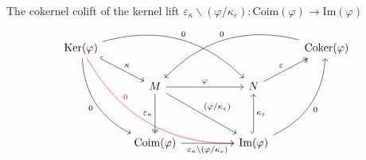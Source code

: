 The cokernel colift of the kernel lift
$\varepsilon_{\kappa}\backslash(\varphi/\kappa_{\varepsilon}) : \mathrm{Coim}(\varphi) \rightarrow \mathrm{Im}(\varphi)$
\[
\begin{tikzcd}
\mathrm{Ker}(\varphi) \arrow[rd, "\kappa", hook] \arrow[rddd, "0"', bend right] \arrow[rrrd, "0", bend left] \arrow[rrrddd, "0", pos=.3, color=red, bend right] &                                                                                                                       &  &                                                                                               & \mathrm{Coker}(\varphi) \arrow[llld, "0"', bend right] \\
                                                                                                                                             & M \arrow[rr, "\varphi"] \arrow[dd, "\varepsilon_{\kappa}"', two heads] \arrow[rrdd, "(\varphi/\kappa_{\varepsilon})"] &  & N \arrow[ru, "\varepsilon", two heads]                                                        &                                                        \\
                                                                                                                                             &                                                                                                                       &  &                                                                                               &                                                        \\
                                                                                                                                             & \mathrm{Coim}(\varphi) \arrow[rr, "\varepsilon_{\kappa}\backslash(\varphi/\kappa_{\varepsilon})"']                    &  & \mathrm{Im}(\varphi) \arrow[uu, "\kappa_{\varepsilon}"', hook] \arrow[ruuu, "0"', bend right] &                                                       
\end{tikzcd}
\]


